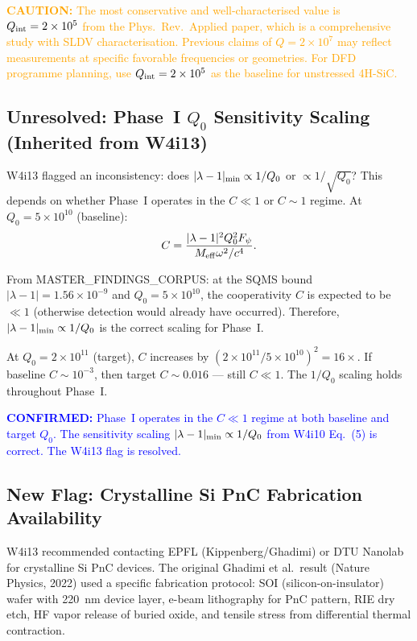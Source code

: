 \documentclass[11pt]{article}
\theoremstyle{definition}
\theoremstyle{remark}
\newcommand{\ee}[1]{\times 10^{#1}}
\newcommand{\Meff}{M_{\rm eff}}
\newcommand{\lam}{|\lambda-1|}
\newcommand{\confirmed}[1]{\textcolor{blue}{\textbf{CONFIRMED:} #1}}
\newcommand{\caution}[1]{\textcolor{orange}{\textbf{CAUTION:} #1}}
\begin{document}
\caution{The most conservative and well-characterised value is
$Q_{\rm int} = 2\ee{5}$ from the Phys.\ Rev.\ Applied paper, which
is a comprehensive study with SLDV characterisation. Previous claims of
$Q = 2\ee{7}$ may reflect measurements at specific favorable frequencies
or geometries. For DFD programme planning, use $Q_{\rm int} = 2\ee{5}$
as the baseline for unstressed 4H-SiC.}

\subsection{Unresolved: Phase~I $Q_0$ Sensitivity Scaling (Inherited from W4i13)}

W4i13 flagged an inconsistency: does $\lam_{\rm min} \propto 1/Q_0$
or $\propto 1/\sqrt{Q_0}$? This depends on whether Phase~I operates
in the $C \ll 1$ or $C \sim 1$ regime. At $Q_0 = 5\ee{10}$ (baseline):
\begin{equation}
C = \frac{\lam^2 Q_0^2 F_\psi}{\Meff \omega^2 / c^4}.
\end{equation}

From MASTER\_FINDINGS\_CORPUS: at the SQMS bound $\lam = 1.56\ee{-9}$
and $Q_0 = 5\ee{10}$, the cooperativity $C$ is expected to be $\ll 1$
(otherwise detection would already have occurred). Therefore,
$\lam_{\rm min} \propto 1/Q_0$ is the correct scaling for Phase~I.

At $Q_0 = 2\ee{11}$ (target), $C$ increases by $(2\ee{11}/5\ee{10})^2
= 16\times$. If baseline $C \sim 10^{-3}$, then target $C \sim 0.016$
--- still $C \ll 1$. The $1/Q_0$ scaling holds throughout Phase~I.

\confirmed{Phase~I operates in the $C \ll 1$ regime at both baseline
and target $Q_0$. The sensitivity scaling $\lam_{\rm min} \propto
1/Q_0$ from W4i10 Eq.~(5) is correct. The W4i13 flag is resolved.}

\subsection{New Flag: Crystalline Si PnC Fabrication Availability}

W4i13 recommended contacting EPFL (Kippenberg/Ghadimi) or DTU Nanolab
for crystalline Si PnC devices. The original Ghadimi et al.\ result
(Nature Physics, 2022) used a specific fabrication protocol: SOI
(silicon-on-insulator) wafer with 220~nm device layer, e-beam
lithography for PnC pattern, RIE dry etch, HF vapor release of
buried oxide, and tensile stress from differential thermal contraction.
\end{document}
